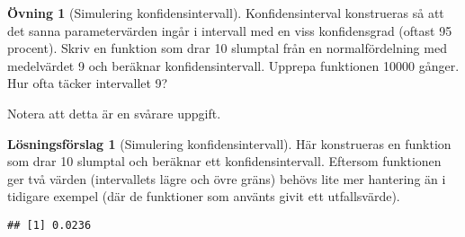 \documentclass[
]{book}
\newenvironment{Shaded}{\begin{snugshade}}{\end{snugshade}}
\newcommand{\AttributeTok}[1]{\textcolor[rgb]{0.77,0.63,0.00}{#1}}
\newcommand{\CommentTok}[1]{\textcolor[rgb]{0.56,0.35,0.01}{\textit{#1}}}
\newcommand{\ControlFlowTok}[1]{\textcolor[rgb]{0.13,0.29,0.53}{\textbf{#1}}}
\newcommand{\DecValTok}[1]{\textcolor[rgb]{0.00,0.00,0.81}{#1}}
\newcommand{\FunctionTok}[1]{\textcolor[rgb]{0.00,0.00,0.00}{#1}}
\newcommand{\NormalTok}[1]{#1}
\newcommand{\OtherTok}[1]{\textcolor[rgb]{0.56,0.35,0.01}{#1}}
\newcommand{\SpecialCharTok}[1]{\textcolor[rgb]{0.00,0.00,0.00}{#1}}
\newcommand{\StringTok}[1]{\textcolor[rgb]{0.31,0.60,0.02}{#1}}
\theoremstyle{definition}
\theoremstyle{definition}
\theoremstyle{definition}
\newtheorem{exercise}{Övning}[chapter]
\theoremstyle{definition}
\newtheorem{hypothesis}{Lösningsförslag}[chapter]
\theoremstyle{remark}
\begin{document}
\begin{exercise}[Simulering konfidensintervall]
Konfidensinterval konstrueras så att det sanna parametervärden ingår i intervall med en viss konfidensgrad (oftast 95 procent). Skriv en funktion som drar 10 slumptal från en normalfördelning med medelvärdet 9 och beräknar konfidensintervall. Upprepa funktionen 10000 gånger. Hur ofta täcker intervallet 9?

Notera att detta är en svårare uppgift.
\end{exercise}

\begin{hypothesis}[Simulering konfidensintervall]
Här konstrueras en funktion som drar 10 slumptal och beräknar ett konfidensintervall. Eftersom funktionen ger två värden (intervallets lägre och övre gräns) behövs lite mer hantering än i tidigare exempel (där de funktioner som använts givit ett utfallsvärde).

\begin{Shaded}
\end{Shaded}

\begin{verbatim}
## [1] 0.0236
\end{verbatim}

\begin{Shaded}
\end{Shaded}


\end{hypothesis}
\end{document}
